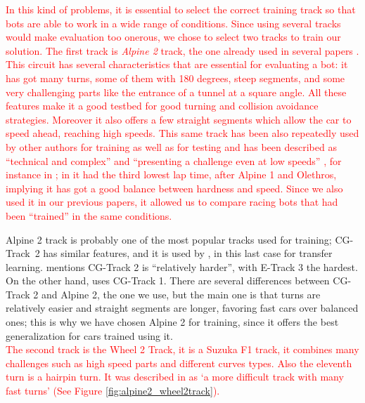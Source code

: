 \documentclass[10pt,journal,compsoc]{IEEEtran}
\begin{document}
\textcolor{red}{
In this kind of problems, it is essential to select the correct
training track so that bots are able to work in a wide range of
conditions. Since using several tracks would make evaluation too onerous, we chose to select two tracks to train our solution.} \textcolor{red}{The first track is \textit{Alpine 2} track, the one already used in several papers  \cite{salem_cig2018,DBLP:conf/cig/SalemMG19}. This circuit has several characteristics that
are essential for evaluating a bot: it has got many turns, some of
them with 180 degrees, steep segments, and some very challenging parts
like the entrance of a tunnel at a square angle. All these features make
it a good testbed for good turning and collision avoidance
strategies. Moreover it also offers a few straight segments which allow the car to speed ahead, reaching high speeds. This same track has been also repeatedly used by other authors for training as well as for testing and has been described as ``technical and complex'' \cite{AG} and ``presenting a challenge even at low speeds'' \cite{vrajitoru2018global}, for instance in
\cite{cardamone2010applying,CarRacing_Pelta09,zong2017obstacle}; in \cite{AG} it had the third lowest lap time, after Alpine 1 and Olethros, implying it
has got a good balance between hardness and speed. Since we also used
it in our previous papers, it allowed us to compare racing bots that
had been ``trained'' in the same conditions.}

Alpine 2 track is probably one of the most popular tracks used for
training; \mbox{CG-Track 2} has similar features, and it is used by
\cite{mirus2019short,8833873,verma2018programmatically},
in this last case for transfer learning. \cite{Kole-ParamCarTunning12}
mentions CG-Track 2 is ``relatively harder'', with E-Track 3 the
hardest. On the other hand, \cite{10.1371/journal.pone.0213193} uses
CG-Track 1. There are several differences between CG-Track 2 and Alpine
2, the one we use, but the main one is that turns are relatively
easier and straight segments are longer, favoring fast cars over
balanced ones; this is why we have chosen Alpine 2 for training, since
it offers the best generalization for cars trained using it.\\
\textcolor{red}{
The second track is the Wheel 2 Track, it is a  Suzuka F1 track, it combines many challenges such as high speed  parts and different curves types. Also the eleventh turn is a hairpin turn. It was  described in \cite{wheel2track_chen} as `a more difficult track with many fast turns' (See Figure \ref{fig:alpine2_wheel2track}).}
\end{document}
